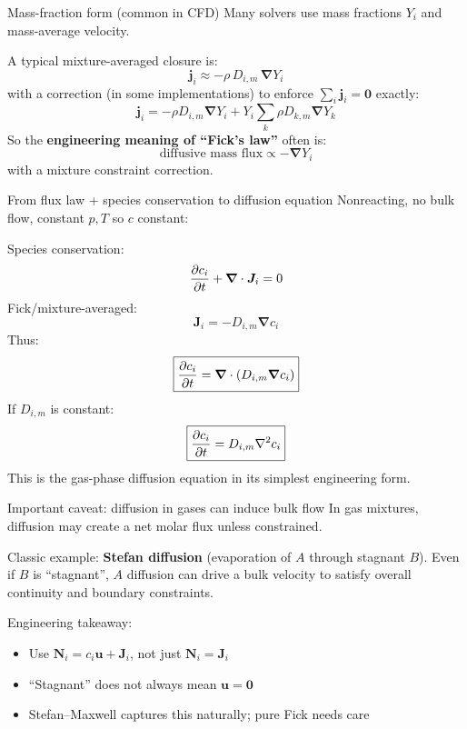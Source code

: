 \documentclass[aspectratio=169]{beamer}
\newcommand{\grad}{\bm{\nabla}}
\newcommand{\J}{\bm{J}}
\newcommand{\N}{\bm{N}}
\newcommand{\jvec}{\bm{j}}
\newcommand{\uvec}{\bm{u}}
\begin{document}
\begin{frame}{Mass-fraction form (common in CFD)}
Many solvers use mass fractions $Y_i$ and mass-average velocity.

A typical mixture-averaged closure is:
\[
\boxed{\jvec_i \approx -\rho\,D_{i,m}\,\grad Y_i}
\]
with a correction (in some implementations) to enforce $\sum_i \jvec_i=\bm{0}$ exactly:
\[
\jvec_i = -\rho D_{i,m}\grad Y_i + Y_i\sum_k \rho D_{k,m}\grad Y_k
\]
So the \textbf{engineering meaning of “Fick’s law”} often is:
\[
\text{diffusive mass flux} \propto -\grad Y_i
\]
with a mixture constraint correction.
\end{frame}

\begin{frame}{From flux law + species conservation to diffusion equation}
Nonreacting, no bulk flow, constant $p,T$ so $c$ constant:

Species conservation:
\[
\pdv{c_i}{t} + \grad\cdot \J_i = 0
\]
Fick/mixture-averaged:
\[
\J_i = -D_{i,m}\grad c_i
\]
Thus:
\[
\boxed{\pdv{c_i}{t} = \grad\cdot\left(D_{i,m}\grad c_i\right)}
\]
If $D_{i,m}$ is constant:
\[
\boxed{\pdv{c_i}{t} = D_{i,m}\nabla^2 c_i}
\]
This is the gas-phase diffusion equation in its simplest engineering form.
\end{frame}

\begin{frame}{Important caveat: diffusion in gases can induce bulk flow}
In gas mixtures, diffusion may create a net molar flux unless constrained.

Classic example: \textbf{Stefan diffusion} (evaporation of $A$ through stagnant $B$).
Even if $B$ is ``stagnant'', $A$ diffusion can drive a bulk velocity to satisfy overall continuity and boundary constraints.

Engineering takeaway:
\begin{itemize}
  \item Use $\N_i = c_i \uvec + \J_i$, not just $\N_i=\J_i$
  \item ``Stagnant'' does not always mean $\uvec=\bm{0}$
  \item Stefan--Maxwell captures this naturally; pure Fick needs care
\end{itemize}
\end{frame}
\end{document}
